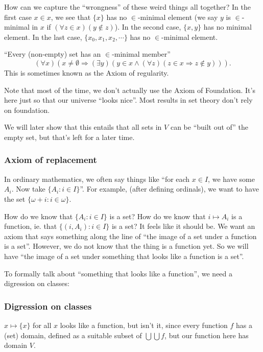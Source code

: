 \documentclass[a4paper]{article}
\begin{document}
How can we capture the ``wrongness'' of these weird things all together? In the first case $x\in x$, we see that $\{x\}$ has no $\in$-minimal element (we say $y$ is $\in$-minimal in $x$ if $(\forall z\in x)(y\not\in z)$). In the second case, $\{x, y\}$ has no minimal element. In the last case, $\{x_0, x_1, x_2, \cdots\}$ has no $\in$-minimal element.


\begin{axiom}
  ``Every (non-empty) set has an $\in$-minimal member''
  \[
    (\forall x)(x\not= \emptyset \Rightarrow  (\exists y)(y\in x\wedge (\forall z)(z\in x \Rightarrow  z\not\in y))).
  \]
  This is sometimes known as the Axiom of regularity.
\end{axiom}
Note that most of the time, we don't actually use the Axiom of Foundation. It's here just so that our universe ``looks nice''. Most results in set theory don't rely on foundation.

We will later show that this entails that all sets in $V$ can be ``built out of'' the empty set, but that's left for a later time.

\subsubsection*{Axiom of replacement}
In ordinary mathematics, we often say things like ``for each $x\in I$, we have some $A_i$. Now take $\{A_i: i\in I\}$''. For example, (after defining ordinals), we want to have the set $\{\omega + i: i\in \omega\}$.

How do we know that $\{A_i: i\in I\}$ is a set? How do we know that $i\mapsto A_i$ is a function, ie. that $\{(i, A_i): i\in I\}$ is a set? It feels like it should be. We want an axiom that says something along the line of ``the image of a set under a function is a set''. However, we do not know  that the thing is a function yet. So we will have ``the image of a set under something that looks like a function is a set''.

To formally talk about ``something that looks like a function'', we need a digression on classes:

\subsubsection*{Digression on classes}
$x\mapsto \{x\}$ for all $x$ looks like a function, but isn't it, since every function $f$ has a (set) domain, defined as a suitable subset of $\bigcup \bigcup f$, but our function here has domain $V$.
\end{document}
